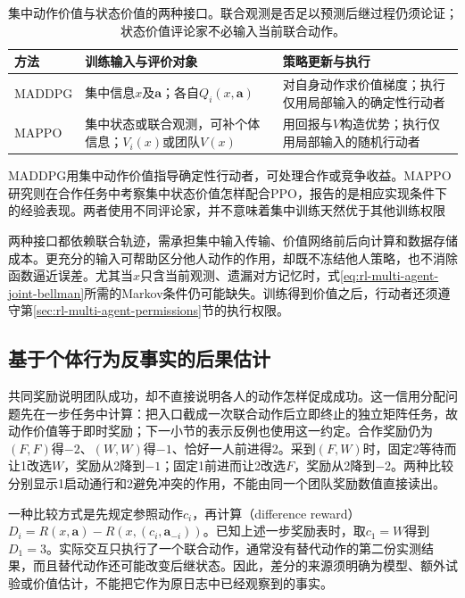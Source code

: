 \begin{table}[htbp]
 \centering
 \begin{tabularx}{\linewidth}{@{}l >{\raggedright\arraybackslash}X >{\raggedright\arraybackslash}X@{}}
 \toprule
 方法 & 训练输入与评价对象 & 策略更新与执行\\
 \midrule
 MADDPG & 集中信息$x$及$\bm a$；各自$Q_i(x,\bm a)$ & 对自身动作求价值梯度；执行仅用局部输入的确定性行动者\\
 MAPPO & 集中状态或联合观测，可补个体信息；$V_i(x)$或团队$V(x)$ & 用回报与$V$构造优势；执行仅用局部输入的随机行动者\\
 \bottomrule
 \end{tabularx}
 \caption{集中动作价值与状态价值的两种接口。联合观测是否足以预测后继过程仍须论证；状态价值评论家不必输入当前联合动作。}
 \label{tab:rl-multi-agent-critics}
\end{table}

MADDPG用集中动作价值指导确定性行动者，可处理合作或竞争收益。MAPPO研究则在合作任务中考察集中状态价值怎样配合PPO，报告的是相应实现条件下的经验表现。两者使用不同评论家，并不意味着集中训练天然优于其他训练权限

两种接口都依赖联合轨迹，需承担集中输入传输、价值网络前后向计算和数据存储成本。更充分的输入可帮助区分他人动作的作用，却既不冻结他人策略，也不消除函数逼近误差。尤其当$x$只含当前观测、遗漏对方记忆时，式\eqref{eq:rl-multi-agent-joint-bellman}所需的Markov条件仍可能缺失。训练得到价值之后，行动者还须遵守第\ref{sec:rl-multi-agent-permissions}节的执行权限。

\subsection{基于个体行为反事实的后果估计}
\label{sec:rl-multi-agent-counterfactual}

共同奖励说明团队成功，却不直接说明各人的动作怎样促成成功。这一信用分配问题先在一步任务中计算：把入口截成一次联合动作后立即终止的独立矩阵任务，故动作价值等于即时奖励；下一小节的表示反例也使用这一约定。合作奖励仍为$(F,F)$得$-2$、$(W,W)$得$-1$、恰好一人前进得2。采到$(F,W)$时，固定2等待而让1改选$W$，奖励从2降到$-1$；固定1前进而让2改选$F$，奖励从2降到$-2$。两种比较分别显示1启动通行和2避免冲突的作用，不能由同一个团队奖励数值直接读出。

一种比较方式是先规定参照动作$c_i$，再计算（difference reward）
$D_i=R(x,\bm a)-R(x,(c_i,\bm a_{-i}))$。已知上述一步奖励表时，取$c_1=W$得到$D_1=3$。实际交互只执行了一个联合动作，通常没有替代动作的第二份实测结果，而且替代动作还可能改变后继状态。因此，差分的来源须明确为模型、额外试验或价值估计，不能把它作为原日志中已经观察到的事实。

